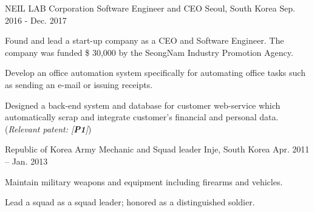 


\begin{cventries}

\cventry
{NEIL LAB Corporation} %
{Software Engineer and CEO} %
{Seoul, South Korea} %
{Sep. 2016 - Dec. 2017} %
{ %
\begin{cvitems}
\item {Found and lead a start-up company as a CEO and Software Engineer. The company was funded \$ 30,000 by the SeongNam Industry Promotion Agency.}
\item {Develop an office automation system specifically for automating office tasks such as sending an e-mail or issuing receipts.}
\item {Designed a back-end system and database for customer web-service which automatically scrap and integrate customer's financial and personal data. (\textit{Relevant patent: [\textbf{P1}]})}
\end{cvitems}
}

\cventry
{Republic of Korea Army} %
{Mechanic and Squad leader} %
{Inje, South Korea} %
{Apr. 2011 – Jan. 2013} %
{ %
\begin{cvitems}
\item {Maintain military weapons and equipment including firearms and vehicles.}
\item {Lead a squad as a squad leader; honored as a distinguished soldier.}
\end{cvitems}
}


\end{cventries}
